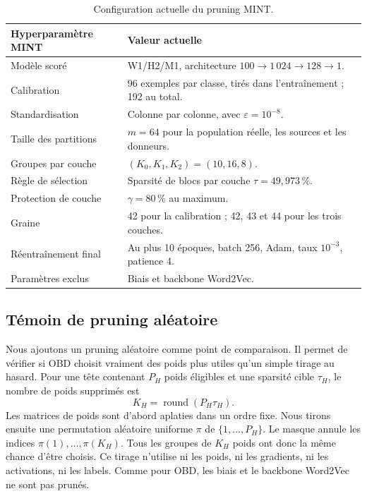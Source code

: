\begin{table}[!ht]
    \centering
    \begin{tabularx}{\textwidth}{|l|X|}
        \hline
        Hyperparamètre MINT & Valeur actuelle \\ \hline
        Modèle scoré & W1/H2/M1, architecture $100\rightarrow1\,024\rightarrow128\rightarrow1$. \\ \hline
        Calibration & 96 exemples par classe, tirés dans l'entraînement ; 192 au total. \\ \hline
        Standardisation & Colonne par colonne, avec $\varepsilon=10^{-8}$. \\ \hline
        Taille des partitions & $m=64$ pour la population réelle, les sources et les donneurs. \\ \hline
        Groupes par couche & $(K_0,K_1,K_2)=(10,16,8)$. \\ \hline
        Règle de sélection & Sparsité de blocs par couche $\tau=49{,}973\,\%$. \\ \hline
        Protection de couche & $\gamma=80\,\%$ au maximum. \\ \hline
        Graine & 42 pour la calibration ; 42, 43 et 44 pour les trois couches. \\ \hline
        Réentraînement final & Au plus 10 époques, batch 256, Adam, taux $10^{-3}$, patience 4. \\ \hline
        Paramètres exclus & Biais et backbone Word2Vec. \\ \hline
    \end{tabularx}
    \caption{Configuration actuelle du pruning MINT.}
    \label{tab:hyperparametres_mint}
\end{table}

\subsection{Témoin de pruning aléatoire}
\label{ssec:methode_random}

Nous ajoutons un pruning aléatoire comme point de comparaison. Il permet de
vérifier si OBD choisit vraiment des poids plus utiles qu'un simple tirage au
hasard. Pour une tête contenant $P_H$ poids éligibles et une sparsité cible
$\tau_H$, le nombre de poids supprimés est
\begin{equation}
    K_H=\operatorname{round}(P_H\tau_H).
    \label{eq:nombre_poids_random}
\end{equation}
Les matrices de poids sont d'abord aplaties dans un ordre fixe. Nous tirons
ensuite une permutation aléatoire uniforme $\pi$ de
$\{1,\ldots,P_H\}$. Le masque annule les indices
$\pi(1),\ldots,\pi(K_H)$. Tous les groupes de $K_H$ poids ont donc la même
chance d'être choisis. Ce tirage n'utilise ni les poids, ni les gradients, ni
les activations, ni les labels. Comme pour OBD, les biais et le backbone
Word2Vec ne sont pas prunés.

